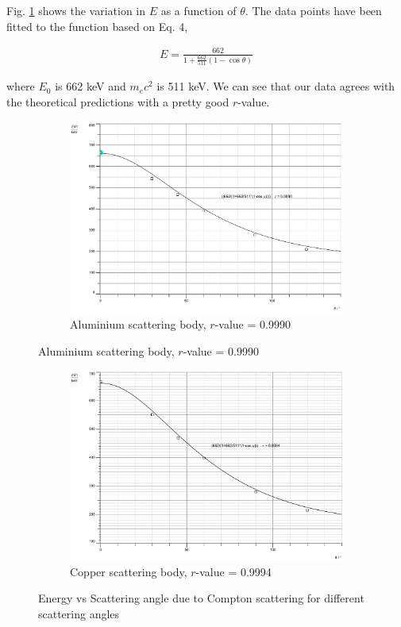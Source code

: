 \vspace{2em}

Fig. \ref{plot2} shows the variation in $E$ as a function of $\theta$. The data points have been fitted to the function based on Eq. 4,

\begin{align*}
    E = \frac{662}{1+\frac{662}{511}(1-\cos \theta)}
\end{align*}

where $E_0$ is 662 keV and $m_ec^2$ is 511 keV. We can see that our data agrees with the theoretical predictions with a pretty good $r$-value.

\begin{figure}[H]
    \begin{subfigure}{\linewidth}
        \centering
        \includegraphics[width=1\columnwidth]{images/al_fit.pdf}
        \caption{Aluminium scattering body, $r$-value = 0.9990}
    \end{subfigure}
\end{figure}
\begin{figure}[H]
    \ContinuedFloat
    \begin{subfigure}{\linewidth}
        \centering
        \includegraphics[width=1\columnwidth]{images/cu_fit.pdf}
        \caption{Copper scattering body, $r$-value = 0.9994}
    \end{subfigure}
    \caption{Energy vs Scattering angle due to Compton scattering for different scattering angles}
    \label{plot2}
\end{figure}


